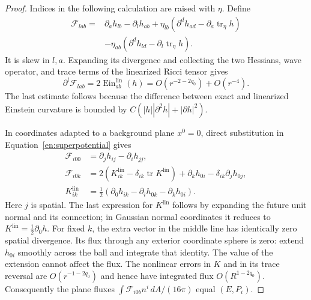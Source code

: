 \begin{proof}
Indices in the following calculation are raised with $\eta$.
Define
\begin{equation}\label{en:superpotential}
 \begin{split}
 \mathcal F_{lab}={}&\partial_a h_{lb}-\partial_l h_{ab}
   +\eta_{lb}(\partial^d h_{ad}-\partial_a\operatorname{tr}_\eta h)\\
   &-\eta_{ab}(\partial^d h_{ld}-\partial_l\operatorname{tr}_\eta h).
 \end{split}
\end{equation}
It is skew in $l,a$. Expanding its divergence and collecting the
two Hessians, wave operator, and trace terms of the linearized Ricci
tensor gives
\begin{equation}\label{en:superpotential-divergence}
 \partial^l\mathcal F_{lab}=2\operatorname{Ein}^{\mathrm{lin}}_{ab}(h)
   =O(r^{-2-2q_0})+O(r^{-4}).
\end{equation}
The last estimate follows because the difference between exact and
linearized Einstein curvature is bounded by
$C(|h||\partial^2h|+|\partial h|^2)$.

In coordinates adapted to a background plane $x^0=0$, direct
substitution in Equation~\ref{en:superpotential} gives
\begin{equation}\label{en:superpotential-components}
 \begin{split}
 \mathcal F_{i00}&=\partial_jh_{ij}-\partial_ih_{jj},\\
 \mathcal F_{i0k}&=2(K^{\mathrm{lin}}_{ik}
                -\delta_{ik}\operatorname{tr}K^{\mathrm{lin}})
                +\partial_kh_{0i}-\delta_{ik}\partial_jh_{0j},\\
 K^{\mathrm{lin}}_{ik}
   &=\tfrac12(\partial_0h_{ik}-\partial_ih_{0k}
                                      -\partial_kh_{0i}).
 \end{split}
\end{equation}
Here $j$ is spatial. The last expression for $K^{\mathrm{lin}}$
follows by expanding the future unit normal and its connection;
in Gaussian normal coordinates it reduces to
$K^{\mathrm{lin}}=\tfrac12\partial_0h$.
For fixed $k$, the extra vector in the middle line has identically
zero spatial divergence. Its flux through any exterior coordinate
sphere is zero: extend $h_{0i}$ smoothly across the ball and integrate
that identity. The value of the extension cannot affect the flux.
The nonlinear errors in $K$ and in its trace reversal are
$O(r^{-1-2q_0})$ and hence have integrated flux
$O(R^{1-2q_0})$. Consequently the plane fluxes
$\int\mathcal F_{i0b}n^i\,dA/(16\pi)$ equal $(E,P_i)$.


\end{proof}
